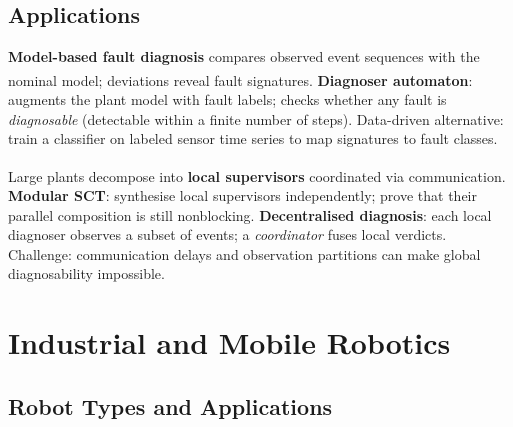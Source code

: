 \subsection{Applications}

\begin{tcbitemize}[ skin=sectionraster ]
    \tcbitem[title={Fault Diagnosis in Production}, raster multicolumn=3]
    \textbf{Model-based fault diagnosis} compares observed event sequences with the nominal model; deviations reveal fault signatures\textsuperscript{\cite[][pp.~420--450]{cassandrasIntroductionDiscreteEvent2009}}.
    \textbf{Diagnoser automaton}: augments the plant model with fault labels; checks whether any fault is \emph{diagnosable} (detectable within a finite number of steps).
    Data-driven alternative: train a classifier on labeled sensor time series to map signatures to fault classes.

    \tcbitem[title={Distributed and Decentralised Supervision}, raster multicolumn=3]
    Large plants decompose into \textbf{local supervisors} coordinated via communication\textsuperscript{\cite[][pp.~460--490]{cassandrasIntroductionDiscreteEvent2009}}.
    \textbf{Modular SCT}: synthesise local supervisors independently; prove that their parallel composition is still nonblocking.
    \textbf{Decentralised diagnosis}: each local diagnoser observes a subset of events; a \emph{coordinator} fuses local verdicts.
    Challenge: communication delays and observation partitions can make global diagnosability impossible.
\end{tcbitemize}

\section{Industrial and Mobile Robotics}

\subsection{Robot Types and Applications}

